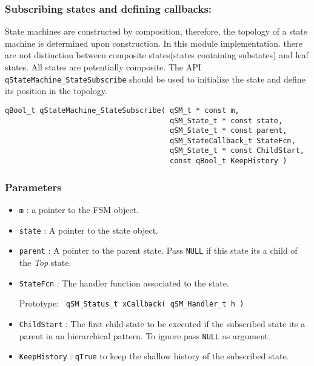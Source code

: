 \subsubsection{Subscribing states and defining callbacks: }
State  machines  are constructed by composition, therefore, the topology of a state machine is determined upon construction.
In this module implementation. there are not distinction between composite states(states containing substates) and leaf states. All states are potentially composite. 
The API \lstinline{qStateMachine_StateSubscribe} should be used to initialize the state and define its position in the topology.
\medskip

\begin{lstlisting}[style=CStyle]
qBool_t qStateMachine_StateSubscribe( qSM_t * const m, 
                                      qSM_State_t * const state, 
                                      qSM_State_t * const parent, 
                                      qSM_StateCallback_t StateFcn, 
                                      qSM_State_t * const ChildStart, 
                                      const qBool_t KeepHistory )
\end{lstlisting}

\subsubsection*{Parameters}
\begin{itemize}
    \item \lstinline{m} : a pointer to the FSM object.
    \item \lstinline{state} :  A pointer to the state object.
    \item \lstinline{parent} : A pointer to the parent state. Pass \lstinline{NULL} if this state its a child of the \textit{Top} state.
    \item \lstinline{StateFcn} : The handler function associated to the state. 

                                 Prototype: \lstinline{ qSM_Status_t xCallback( qSM_Handler_t h ) }
    \item \lstinline{ChildStart} : The first child-state to be executed if the subscribed state its a parent in an hierarchical pattern. To ignore pass \lstinline{NULL} as argument.
    \item \lstinline{KeepHistory} : \lstinline{qTrue} to keep the shallow history of the subscribed state.
\end{itemize}  

